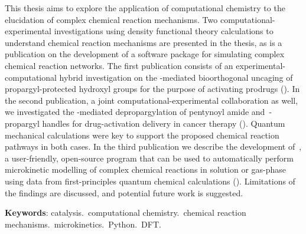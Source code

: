 \setlength{\absparsep}{18pt} %

\begin{resumo}[Abstract]
	This thesis aims to explore the application of computational chemistry to the elucidation of complex chemical reaction mechanisms.
	Two computational-experimental investigations using density functional theory calculations to understand chemical reaction mechanisms are presented in the thesis,
	as is a publication on the development of a software package for simulating complex chemical reaction networks.
	The first publication consists of an experimental-computational hybrid investigation on the -mediated bioorthogonal uncaging of propargyl-protected hydroxyl groups for the purpose of activating prodrugs
	().
	In the second publication,
	a joint computational-experimental collaboration as well,
	we investigated the -mediated depropargylation of pentynoyl amide and~-propargyl handles for drug-activation delivery in cancer therapy
	().
	Quantum mechanical calculations were key to support the proposed chemical reaction pathways in both cases.
	In the third publication
	we describe the development of~\overreact{},
	a user-friendly,
	open-source program that can be used
	to automatically perform microkinetic modelling of complex chemical reactions in solution or gas-phase
	using data from first-principles quantum chemical calculations
	().
	Limitations of the findings are discussed,
	and potential future work is suggested.

	\vspace{\onelineskip}

	\noindent
	\textbf{Keywords}:
	catalysis.\ computational chemistry.\ chemical reaction mechanisms.\ microkinetics.\ Python.\ DFT.\@
\end{resumo}

